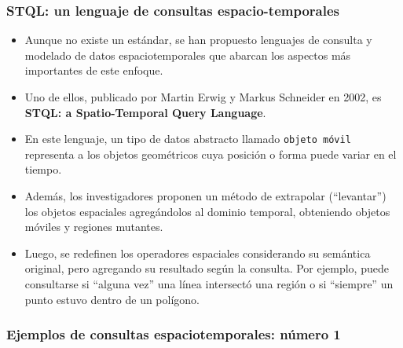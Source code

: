 \begin{frame}
\frametitle{STQL: un lenguaje de consultas espacio-temporales}
\begin{itemize}

	\item	Aunque no existe un estándar, se han propuesto lenguajes de
	consulta y modelado de datos espaciotemporales que abarcan los aspectos
	más importantes de este enfoque. \pause

	\item	Uno de ellos, publicado por Martin Erwig y Markus Schneider en 2002,
	es \textbf{STQL: a Spatio-Temporal Query Language}. \pause

	\item	En este lenguaje, un tipo de datos abstracto llamado
	\texttt{objeto móvil} representa a los objetos geométricos cuya posición
	o forma puede variar en el tiempo. \pause

	\item	Además, los investigadores proponen un método de extrapolar
	(``levantar'') los objetos espaciales agregándolos al dominio
	temporal, obteniendo objetos móviles y regiones mutantes. \pause

	\item	Luego, se redefinen los operadores espaciales considerando su
	semántica original, pero agregando su resultado según la consulta.
	Por ejemplo, puede consultarse si ``alguna vez'' una línea intersectó
	una región o si ``siempre'' un punto estuvo dentro de un polígono.
\end{itemize}
\end{frame}

\begin{frame}
\frametitle{Ejemplos de consultas espaciotemporales: número 1}
\end{frame}

